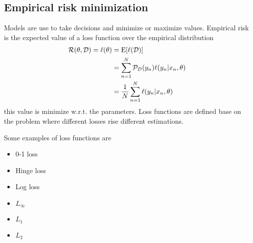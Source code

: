 \documentclass[../main.tex]{subfiles}
\begin{document}
\subsection{Empirical risk minimization}
Models are use to take decisions and minimize or maximize values. Empirical risk is the expected value of a loss function over the empirical distribution
\begin{align*}
    \mathcal{R}(\theta,\mathcal{D})=\ell(\theta) &= \mathrm{E}[\ell(\mathcal{D})]\\
    &=\sum_{n=1}^N \mathcal{P}_{\mathcal{D}}(y_n)\ell(y_n|x_n,\theta)\\
    &=\frac{1}{N} \sum_{n=1}^N \ell(y_n|x_n,\theta)\\
\end{align*}
this value is minimize w.r.t. the parameters. Loss functions are defined base on the problem where different losses rise different estimations.

Some examples of loss functions are
\begin{itemize}
    \item 0-1 loss
    \item Hinge loss
    \item Log loss
    \item $L_\infty$
    \item $L_1$
    \item $L_2$
\end{itemize}
\end{document}
